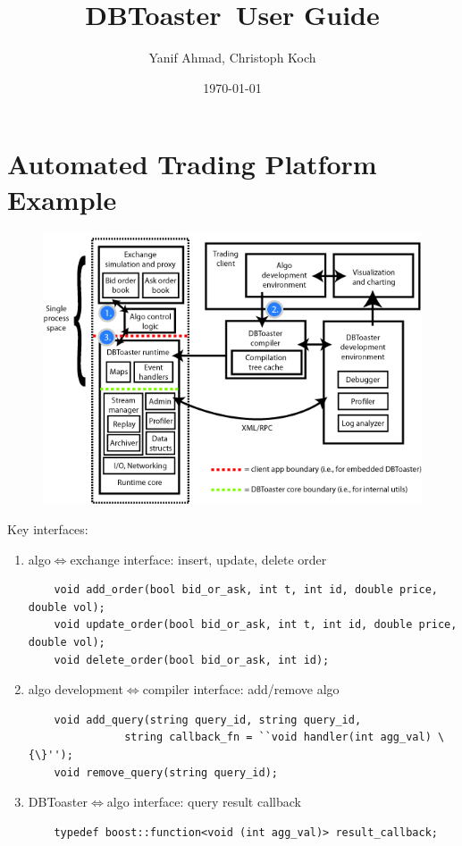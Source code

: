 \documentclass{article}
\newcommand{\compiler}{DBToaster}
\begin{document}
\title{\compiler\ User Guide}
\author{Yanif Ahmad, Christoph Koch}
\date{\today}
\maketitle

\section{Automated Trading Platform Example}

\begin{figure}[h]
\includegraphics[scale=0.7]{../figures/finapp.jpg}
\label{fig:finapp}
\end{figure}

Key interfaces:
\begin{enumerate}
\item algo$\iff$exchange interface: insert, update, delete order
\begin{verbatim}
	void add_order(bool bid_or_ask, int t, int id, double price, double vol);
	void update_order(bool bid_or_ask, int t, int id, double price, double vol);
	void delete_order(bool bid_or_ask, int id);
\end{verbatim}

\item algo development$\iff$compiler interface: add/remove algo
\begin{verbatim}
	void add_query(string query_id, string query_id,
               string callback_fn = ``void handler(int agg_val) \{\}'');
	void remove_query(string query_id);
\end{verbatim}
 
\item DBToaster$\iff$algo interface: query result callback
\begin{verbatim}
	typedef boost::function<void (int agg_val)> result_callback;
\end{verbatim}
\end{enumerate}
\end{document}
